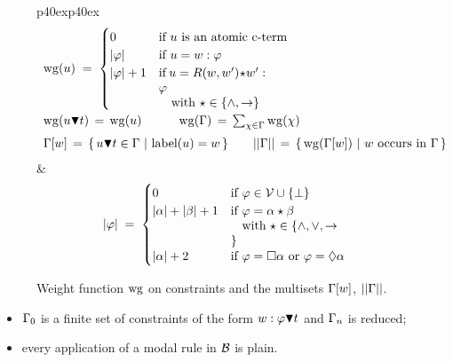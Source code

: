 \begin{figure}[t]
  \centering
  \begin{tabular}{p{40ex}p{40ex}}\small
    \[
    \begin{array}{l}
      \wg{u} \;=\;
      \begin{cases}
        0 & \mbox{if $u$ is an atomic c-term}
        \\
        \size{\varphi}& \mbox{if $u = w:\varphi$}
        \\
        \size{\varphi} + 1&\begin{minipage}[t]{20ex}
          if $u = R(w,w')\star w':\varphi$\par~~~with $\star\in \{\land,\to\}$
        \end{minipage}
      \end{cases}
      \\[7ex]
      \wg{u\abstractorder t}\,=\,\wg{u}
      \hspace{3em}
      \wg{\G}\,=\,\sum_{\chi\in\Gamma} \wg{\chi}
      \\[1.5ex]
      \G[w] \,=\,\{\, u  \abstractorder t\in\G~|~\mbox{$\lab{u} = w$}\,\}
      \qquad
      \sizem{\G} \,=\, \{\, \wg{\G[w]}~|~\mbox{$w$ occurs in $\G$}    \,\}
    \end{array}    
    \]
    &\small
    \[
    \size{\varphi} \;=\;
    \begin{cases}
      0 & \mbox{if $\varphi\in\PV\cup\{\bot\}$}
      \\
      \size{\a} + \size{\b} + 1 &\begin{minipage}[t]{20ex}
        if $\varphi=\a\star\b$\par~~~with $\star\in \{\land,\lor,\to\}$
      \end{minipage}
      \\[2ex]
      \size{\a} + 2 & \mbox{if $\varphi=\Box\a$ or $\varphi=\Diam\a$}
    \end{cases}
    \]
  \end{tabular}
  \vspace{-2ex}
\caption{Weight function $\mathrm{wg}$ on constraints and the multisets $\Gamma[w]$,  $||\Gamma||$.}
\label{fig:weight}
\end{figure}
  
\begin{itemize}[leftmargin=*]
\item $\Gamma_0$ is a finite set of constraints of the form
  $w:\varphi\blacktriangledown t$ and  $\Gamma_n$ is reduced;

\item every application of a modal rule in $\mathcal{B}$ is plain.
\end{itemize}


